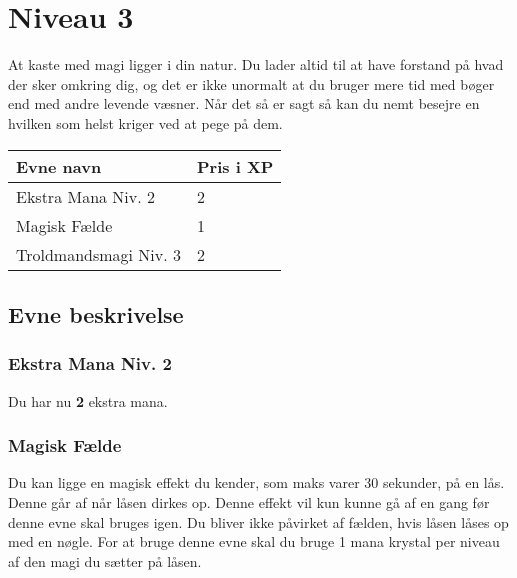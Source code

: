\chapter*{Niveau 3}
At kaste med magi ligger i din natur. Du lader altid til at have forstand på hvad der sker omkring dig, og det er ikke unormalt at du bruger mere tid med bøger end med andre levende væsner. Når det så er sagt så kan du nemt besejre en hvilken som helst kriger ved at pege på dem.

\begin{table}[H]
    \centering
    \begin{tabular}{|p{}|p{}|}
    \rowcolor{cerulean!80}\hline
        Evne navn & Pris i XP \\\hline
        Ekstra Mana Niv. 2 & 2\\\hline
        Magisk Fælde & 1\\\hline 
        Troldmandsmagi Niv. 3 & 2\\\hline
    \end{tabular}
\end{table}
\section*{Evne beskrivelse}

\subsection*{Ekstra Mana Niv. 2} 
Du har nu \textbf{2} ekstra mana.


\subsection*{Magisk Fælde}
Du kan ligge en magisk effekt du kender, som maks varer 30 sekunder, på en lås. Denne går af når låsen dirkes op. Denne effekt vil kun kunne gå af en gang før denne evne skal bruges igen. Du bliver ikke påvirket af fælden, hvis låsen låses op med en nøgle. For at bruge denne evne skal du bruge 1 mana krystal per niveau af den magi du sætter på låsen.


